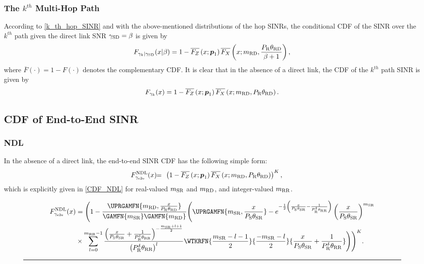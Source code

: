 \documentclass[10pt,journal]{IEEEtran}
\begin{document}
\subsubsection{The $k^{th}$ Multi-Hop Path} According to \eqref{k_th_hop_SINR} and with the above-mentioned distributions of the hop \acp{SINR}, the conditional \ac{CDF} of the \ac{SINR} over the $k^{th}$ path given the direct link \ac{SNR} $\gamma_{{\rm S} {\rm D}}=\beta$ is given by
\begin{eqnarray}
F_{\gamma_{k} \vert \gamma_{{\rm S} {\rm D}}}(x \vert \beta)
=1-\overline{F_{Z}}\left(x;\boldsymbol{p}_1\right) \overline{F_X}\left(x;{m_{{\rm R} {\rm D}}},\frac{P_{{\rm R}}{\theta_{{\rm R} {\rm D}}}}{\beta+1}\right),
\end{eqnarray}
where $\overline{F}(\cdot)=1- F(\cdot)$ denotes the complementary \ac{CDF}. It is clear that in the absence of a direct link, the \ac{CDF} of the $k^{th}$ path \ac{SINR} is given by
\begin{eqnarray}
F_{\gamma_{k}}(x)
=1-\overline{F_{Z}}\left(x;\boldsymbol{p}_1\right) \overline{F_X}\left(x;{m_{{\rm R} {\rm D}}},P_{{\rm R}}{\theta_{{\rm R} {\rm D}}}\right).
\end{eqnarray}
\subsection{CDF of End-to-End SINR}
\subsubsection{\ac{NDL}} In the absence of a direct link, the end-to-end \ac{SINR} \ac{CDF} has the following simple form:
\begin{eqnarray}
\!\!\!\!\!\!\!\!\!\!\CDFNDL
\!\!&=&\!\!  \left(  1-\overline{F_{Z}}\left(\RVval;\pv_1\right) \overline{F_X}\left(\RVval;\mrd,\PR\thetard\right) \right)^K,
\end{eqnarray}
which is explicitly given in \eqref{CDF_NDL} for real-valued ${m_{{\rm S} {\rm R}}}$ and ${m_{{\rm R} {\rm D}}}$, and integer-valued ${m_{{\rm R} {\rm R}}}$.
\begin{figure*}
\centering
\begin{equation}
\begin{split}
\CDFNDL
&=\Bigg(1-\frac{\UPRGAMFN{\mrd,\frac{\RVval}{\PR\thetard}}}{\GAMFN{\msr}\GAMFN{\mrd}}\Bigg(\UPRGAMFN{\msr,\frac{\RVval}{\PS\thetasr}} - e^{-\frac{1}{2}\left(\frac{\RVval}{\PS\thetasr}-\frac{1}{\PR^\PWRSCL\thetarr}\right)}\left(\frac{\RVval}{\PS\thetasr}\right)^{\msr}\\
&\times \sum_{l=0}^{\mrr-1}\frac{\left(\frac{\RVval}{\PS\thetasr}+\frac{1}{\PR^\PWRSCL\thetarr}\right)^{-\frac{\msr+l+1}{2}}}{{\left(\PR^\PWRSCL\thetarr\right)}^{l}} \WTKRFN{\frac{\msr-l-1}{2}}{\frac{-\msr-l}{2}}{\frac{\RVval}{\PS\thetasr}+\frac{1}{\PR^\PWRSCL\thetarr}}\Bigg)\Bigg)^K.
\end{split}\label{CDF_NDL}
\end{equation}
\hrule
\end{figure*}
\end{document}
